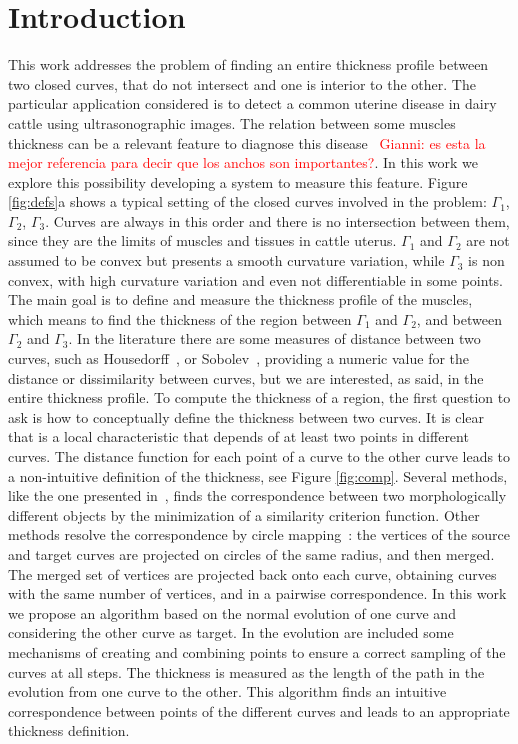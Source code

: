 \documentclass{article}
\begin{document}
\section{Introduction}
\label{sec:intro}
This work addresses the problem of finding an entire thickness profile between two closed curves, that do not intersect and one is interior to the other. The particular application considered is to detect a common uterine disease in dairy cattle using ultrasonographic images. 
The relation between some muscles thickness can be a relevant feature to diagnose this disease~\cite{gianni2010} \textcolor{red}{Gianni: es esta la mejor referencia para decir que los anchos son importantes?}.
In this work we explore this possibility developing a system to measure this feature. Figure \ref{fig:defs}a shows a typical setting of the closed curves involved in the problem: $\Gamma_1$, $\Gamma_2$, $\Gamma_3$. Curves are always in this order and there is no intersection between them, since they are the limits of muscles and tissues in cattle uterus. $\Gamma_1$ and $\Gamma_2$ are not assumed to be convex but presents a smooth curvature variation, while $\Gamma_3$ is non convex, with high curvature variation and even not differentiable in some points. The main goal is to define and measure the thickness profile of the muscles, which means to find the thickness of the region between $\Gamma_1$ and $\Gamma_2$, and between $\Gamma_2$ and $\Gamma_3$. In the literature there are some measures of distance between two curves, such as Housedorff~\cite{libroMorel}, or Sobolev~\cite{statistics}, providing a numeric value for the distance or dissimilarity between curves, but we are interested, as said, in the entire thickness profile. To compute the thickness of a region, the first question to ask is how to conceptually define the thickness between two curves. It is clear that is a local characteristic that depends of at least two points in different curves. The distance function for each point of a curve to the other curve leads to a non-intuitive definition of the thickness, see Figure \ref{fig:comp}. Several methods, like the one presented in~\cite{paperWarping}, finds the correspondence between two morphologically different objects by the minimization of a similarity criterion function. Other methods resolve the correspondence by circle mapping~\cite{libro}: the vertices of the source and target curves are projected on circles of the same radius, and then merged. The merged set of vertices are projected back onto each curve, obtaining curves with the same number of vertices, and in a pairwise correspondence. In this work we propose an algorithm based on the normal evolution of one curve and considering the other curve as target. In the evolution are included some mechanisms of creating and combining points to ensure a correct sampling of the curves at all steps. The thickness is measured as the length of the path in the evolution from one curve to the other. This algorithm finds an intuitive correspondence between points of the different curves and leads to an appropriate thickness definition.
\end{document}
